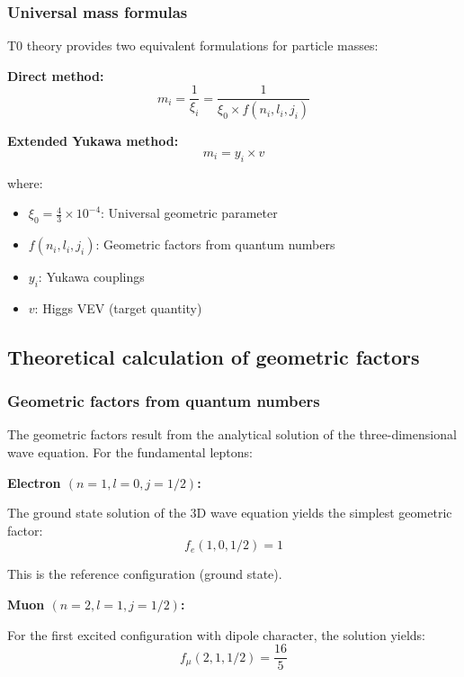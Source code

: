 \documentclass[12pt,a4paper]{report}
\begin{document}
\subsubsection{Universal mass formulas}

T0 theory provides two equivalent formulations for particle masses:

\textbf{Direct method:}
\begin{equation}
	m_i = \frac{1}{\xi_i} = \frac{1}{\xi_0 \times f(n_i, l_i, j_i)}
	\label{eq:direct_mass_formula}
\end{equation}

\textbf{Extended Yukawa method:}
\begin{equation}
	m_i = y_i \times v
	\label{eq:yukawa_mass_formula}
\end{equation}

where:
\begin{itemize}
	\item $\xi_0 = \frac{4}{3} \times 10^{-4}$: Universal geometric parameter
	\item $f(n_i, l_i, j_i)$: Geometric factors from quantum numbers
	\item $y_i$: Yukawa couplings
	\item $v$: Higgs VEV (target quantity)
\end{itemize}

\subsection{Theoretical calculation of geometric factors}

\subsubsection{Geometric factors from quantum numbers}

The geometric factors result from the analytical solution of the three-dimensional wave equation. For the fundamental leptons:

\textbf{Electron $(n=1, l=0, j=1/2)$:}

The ground state solution of the 3D wave equation yields the simplest geometric factor:
\begin{equation}
	f_e(1,0,1/2) = 1
\end{equation}

This is the reference configuration (ground state).

\textbf{Muon $(n=2, l=1, j=1/2)$:}

For the first excited configuration with dipole character, the solution yields:
\begin{equation}
	f_\mu(2,1,1/2) = \frac{16}{5}
\end{equation}
\end{document}
